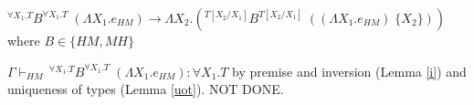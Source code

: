 \begin{case}
$^{\forall X_{1}.T}B^{\forall X_{1}.T}\;(\Lambda X_{1}.e_{HM})\rightarrow\Lambda X_{2}.(^{T[X_{2}/X_{1}]}B^{T[X_{2}/X_{1}]}\;((\Lambda X_{1}.e_{HM})\;\lbrace X_{2}\rbrace))$ where $B\in\lbrace HM,MH\rbrace$

$\Gamma\vdash_{HM}\,^{\forall X_{1}.T}B^{\forall X_{1}.T}\;(\Lambda X_{1}.e_{HM}):\forall X_{1}.T$ by premise and inversion (Lemma \ref{i}) and uniqueness of types (Lemma \ref{uot}).  NOT DONE.
\end{case}